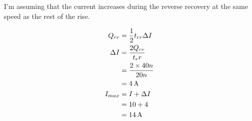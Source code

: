 \subsection{}


\begin{center}

\end{center}

I'm assuming that the current increases during the reverse recovery at the same speed as the rest of the rise.

\begin{align*}
Q_{rr}   & = \frac{1}{2} t_{rr} \Delta I \\
\Delta I & = \frac{2Q_{rr}}{t_rr} \\
         & = \frac{2 \times 40n}{20n} \\
         & = \unit[4]{A} \\
I_{max}  & = I + \Delta I \\
         & = 10 + 4 \\
         & = \unit[14]{A}
\end{align*}
